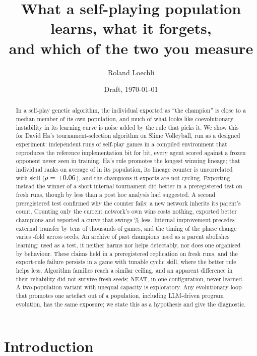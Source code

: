 \documentclass[11pt]{article}
\title{What a self-playing population learns, what it forgets,\\
       and which of the two you measure}
\author{Roland Loechli}
\date{Draft, \today}
\begin{document}
\maketitle

\begin{abstract}
In a self-play genetic algorithm, the individual exported as ``the champion''
is close to a median member of its own population, and much of what looks like
coevolutionary instability in its learning curve is noise added by the rule
that picks it. We show this for David Ha's tournament-selection algorithm on
Slime Volleyball, run as a designed experiment: \nNRunsTotal{} independent runs
of \nBudget{} self-play games in a compiled environment that reproduces the
reference implementation bit for bit, every agent scored against a frozen
opponent never seen in training. Ha's rule promotes the longest winning
lineage; that individual ranks on average \nProxyRankMean{} of \nProxyPop{} in
its population, its lineage counter is uncorrelated with skill
($\rho=+0.06$), and the champions it exports are not cycling. Exporting instead the
winner of a short internal tournament did better in a preregistered test on
fresh runs, though by less than a post hoc analysis had suggested. A second
preregistered test confirmed why the counter fails: a new network inherits its
parent's count. Counting only the current network's own wins costs nothing,
exported better champions and reported a curve that swings \nCtrVolDropPct\%
less. Internal
improvement precedes external transfer by tens of thousands of games, and the
timing of the phase change varies \nCtrlTInternalRatio-fold across seeds. An
archive of past champions used as a parent abolishes learning; used as a test,
it neither harms nor helps detectably, nor does one organised by behaviour.
These claims held in a preregistered replication on \nRepTotal{} fresh runs,
and the export-rule failure persists in a game with tunable cyclic skill, where
the better rule helps less. Algorithm families reach a similar
ceiling, and an apparent difference in their reliability did not survive fresh
seeds; NEAT, in one configuration, never learned. A two-population variant
with unequal capacity is exploratory. Any evolutionary loop that promotes one
artefact out of a population, including LLM-driven program evolution, has the
same exposure; we state this as a hypothesis and give the diagnostic.
\end{abstract}

\section{Introduction}
\end{document}
